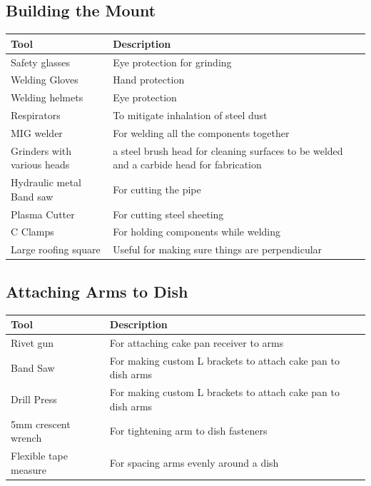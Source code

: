 \documentclass[11pt]{article} %
\begin{document}
\subsection{Building the Mount}
\begin{tabular}{| l | p{10cm} |}
\hline
\textbf{Tool} & \textbf{Description} \\ \hline \hline
Safety glasses & Eye protection for grinding \\ \hline
Welding Gloves & Hand protection \\ \hline
Welding helmets & Eye protection \\ \hline
Respirators & To mitigate inhalation of steel dust \\ \hline
MIG welder & For welding all the components together \\ \hline
Grinders with various heads & a steel brush head for cleaning surfaces to be welded and a carbide head for fabrication \\ \hline
Hydraulic metal Band saw & For cutting the pipe \\ \hline
Plasma Cutter & For cutting steel sheeting \\ \hline
C Clamps & For holding components while welding \\ \hline
Large roofing square & Useful for making sure things are perpendicular \\ \hline
\end{tabular}


\subsection{Attaching Arms to Dish}
\begin{tabular}{| l | p{10cm} |}
\hline
\textbf{Tool} & \textbf{Description} \\ \hline \hline
Rivet gun & For attaching cake pan receiver to arms \\ \hline
Band Saw & For making custom L brackets to attach cake pan to dish arms \\ \hline
Drill Press & For making custom L brackets to attach cake pan to dish arms \\ \hline
5mm crescent wrench & For tightening arm to dish fasteners \\ \hline
Flexible tape measure & For spacing arms evenly around a dish \\ \hline
\end{tabular}
\end{document}
